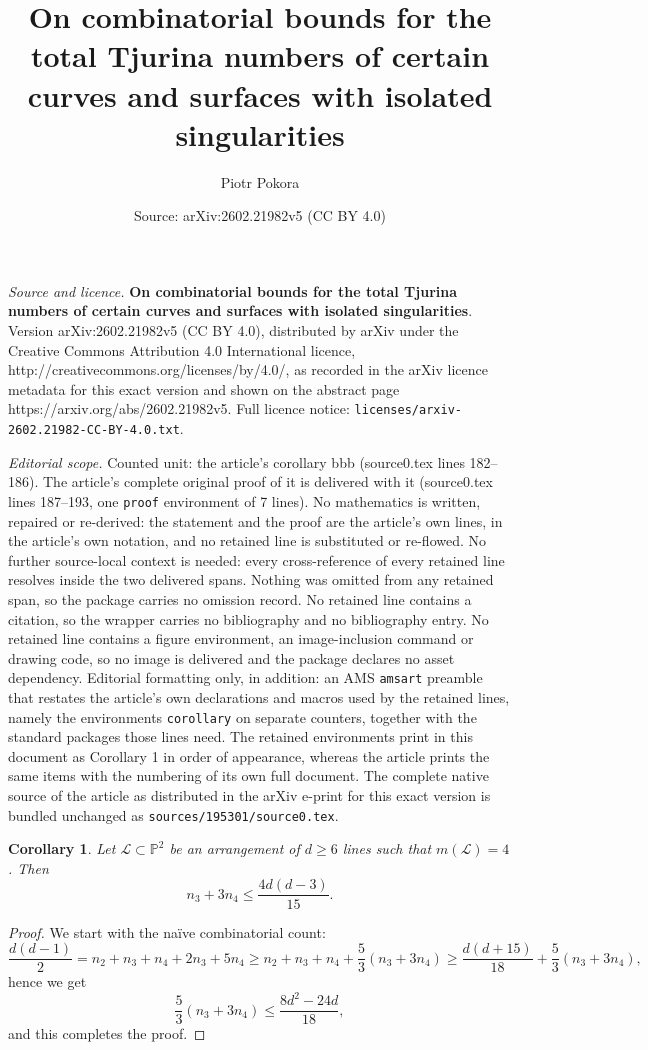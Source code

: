 \documentclass[10pt,a4paper]{amsart}
\title{\textbf{On combinatorial bounds for the total Tjurina numbers of certain curves and surfaces with isolated singularities}}
\author{Piotr Pokora}
\date{Source: arXiv:2602.21982v5 (CC BY 4.0)}
\newtheorem{corollary}{Corollary}
\begin{document}
\maketitle

\noindent\emph{Source and licence.} \textbf{On combinatorial bounds for the total Tjurina numbers of certain curves and surfaces with isolated singularities}. Version arXiv:2602.21982v5 (CC BY 4.0), distributed by arXiv under the Creative Commons Attribution 4.0 International licence, http://creativecommons.org/licenses/by/4.0/, as recorded in the arXiv licence metadata for this exact version and shown on the abstract page https://arxiv.org/abs/2602.21982v5. Full licence notice: \texttt{licenses/arxiv-2602.21982-CC-BY-4.0.txt}.\par\smallskip

\noindent\textit{Editorial scope.} Counted unit: the article's corollary bbb (source0.tex lines 182--186). The article's complete original proof of it is delivered with it (source0.tex lines 187--193, one \texttt{proof} environment of 7 lines). No mathematics is written, repaired or re-derived: the statement and the proof are the article's own lines, in the article's own notation, and no retained line is substituted or re-flowed.  No further source-local context is needed: every cross-reference of every retained line resolves inside the two delivered spans.  Nothing was omitted from any retained span, so the package carries no omission record.  No retained line contains a citation, so the wrapper carries no bibliography and no bibliography entry.  No retained line contains a figure environment, an image-inclusion command or drawing code, so no image is delivered and the package declares no asset dependency.  Editorial formatting only, in addition: an AMS \texttt{amsart} preamble that restates the article's own declarations and macros used by the retained lines, namely the environments \texttt{corollary} on separate counters, together with the standard packages those lines need.  The retained environments print in this document as Corollary 1 in order of appearance, whereas the article prints the same items with the numbering of its own full document.  The complete native source of the article as distributed in the arXiv e-print for this exact version is bundled unchanged as \texttt{sources/195301/source0.tex}.
\begin{corollary}
\label{bbb}
Let $\mathcal{L} \subset \mathbb{P}^{2}$ be an arrangement of $d\geq 6$ lines such that $m(\mathcal{L})=4$. Then
$$n_{3}+3n_{4} \leq \frac{4d(d-3)}{15}.$$
\end{corollary} 

\begin{proof}
We start with the na\"ive combinatorial count:
\[ \frac{d(d-1)}{2} = n_{2} + n_{3} + n_{4} + 2n_{3}+5n_{4} \geq n_{2}+n_{3}+n_{4} + \frac{5}{3}(n_{3}+3n_{4})\geq \frac{d(d+15)}{18}+\frac{5}{3}(n_{3}+3n_{4}),\]
hence we get
$$\frac{5}{3}(n_{3}+3n_{4}) \leq \frac{8d^{2}-24d}{18},$$
and this completes the proof.
\end{proof}
\end{document}
